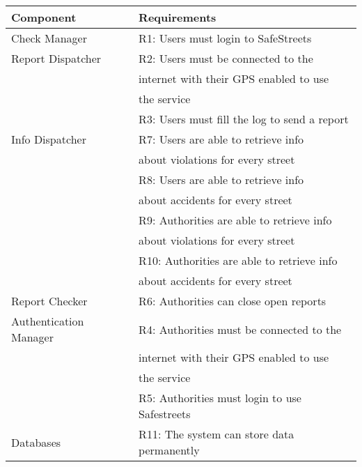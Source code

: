\begin{tabular}{|l|l|}
	\hline    
    \textbf{Component}      & \textbf{Requirements} \\ \hline

    Check Manager           & R1: Users must login to SafeStreets \\ \hline
    Report Dispatcher       & R2: Users must be connected to the\\
                                & internet with their GPS enabled to use\\
                                & the service \\
                            & R3: Users must fill the log to send a report \\ \hline
    Info Dispatcher         & R7: Users are able to retrieve info\\
                                & about violations for every street \\ 
                            & R8: Users are able to retrieve info\\
                                & about accidents for every street \\ 
                            & R9: Authorities are able to retrieve info\\
                                & about violations for every street \\
                            & R10: Authorities are able to retrieve info\\
                                & about accidents for every street\\ \hline
    Report Checker          & R6: Authorities can close open reports \\ \hline
    Authentication Manager  & R4: Authorities must be connected to the\\
                              & internet with their GPS enabled to use\\
                              & the service \\
                            & R5: Authorities must login to use Safestreets\\ \hline
    Databases               & R11: The system can store data permanently \\ \hline
    
\end{tabular}